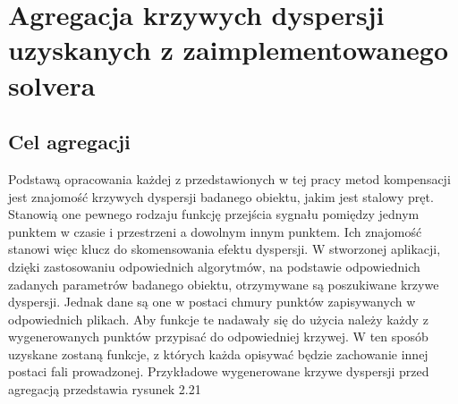 \section{Agregacja krzywych dyspersji uzyskanych z zaimplementowanego solvera}
\label{sec:agregacja}

\subsection{Cel agregacji}
Podstawą opracowania każdej z przedstawionych w tej pracy metod kompensacji jest znajomość krzywych dyspersji badanego obiektu, jakim jest stalowy pręt. Stanowią one pewnego rodzaju funkcję przejścia sygnału pomiędzy jednym punktem w czasie i przestrzeni a dowolnym innym punktem. Ich znajomość stanowi więc klucz do skomensowania efektu dyspersji. W stworzonej aplikacji, dzięki zastosowaniu odpowiednich algorytmów, na podstawie odpowiednich zadanych parametrów badanego obiektu, otrzymywane są poszukiwane krzywe dyspersji. Jednak dane są one w postaci chmury punktów zapisywanych w odpowiednich plikach. Aby funkcje te nadawały się do użycia należy każdy z wygenerowanych punktów przypisać do odpowiedniej krzywej. W ten sposób uzyskane zostaną funkcje, z których każda opisywać będzie zachowanie innej postaci fali prowadzonej. Przykładowe wygenerowane krzywe dyspersji przed agregacją przedstawia rysunek 2.21

